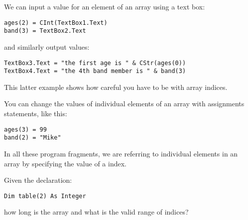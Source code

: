 		We can input a value for an element of an array using a text box:
		\begin{lstlisting}
ages(2) = CInt(TextBox1.Text)
band(3) = TextBox2.Text
		\end{lstlisting}
		and similarly output values:
		\begin{lstlisting}
TextBox3.Text = "the first age is " & CStr(ages(0))
TextBox4.Text = "the 4th band member is " & band(3)
		\end{lstlisting}
		This latter example shows how careful you have to be with array indices.
		
		You can change the values of individual elements of an array with assignments statements, like this:
		\begin{lstlisting}
ages(3) = 99
band(2) = "Mike"
		\end{lstlisting}
		In all these program fragments, we are referring to individual elements in an array by specifying the value of a index.

		\begin{stqb}
			\begin{STQ}
				\item	Given the declaration:
					\begin{lstlisting}
Dim table(2) As Integer
					\end{lstlisting}
					how long is the array and what is the valid range of indices?
			\end{STQ}
		\end{stqb}

